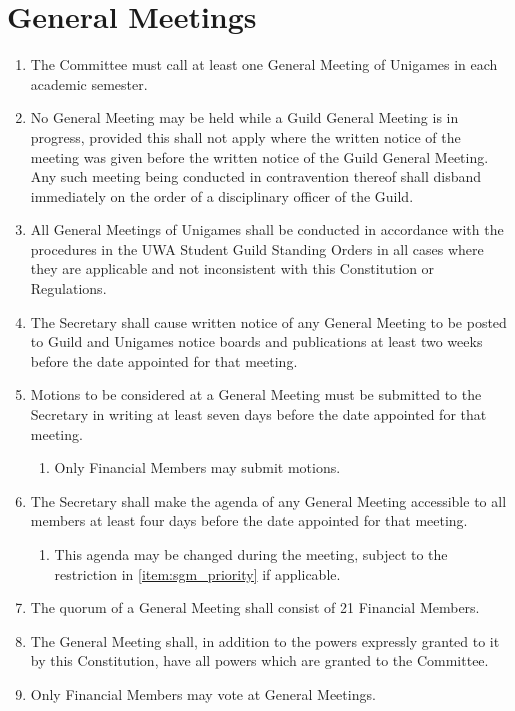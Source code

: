 \documentclass[a4paper]{article}
\begin{document}
\section{General Meetings} \label{sec:general_meetings}
\begin{enumerate}
    \item The Committee must call at least one General Meeting of Unigames in each academic semester.
    \item No General Meeting may be held while a Guild General Meeting is in progress, provided this shall not apply where the written notice of the meeting was given before the written notice of the Guild General Meeting. Any such meeting being conducted in contravention thereof shall disband immediately on the order of a disciplinary officer of the Guild.
    \item All General Meetings of Unigames shall be conducted in accordance with the procedures in the UWA Student Guild Standing Orders in all cases where they are applicable and not inconsistent with this Constitution or Regulations.
    \item The Secretary shall cause written notice of any General Meeting to be posted to Guild and Unigames notice boards and publications at least two weeks before the date appointed for that meeting.
    \item Motions to be considered at a General Meeting must be submitted to the Secretary in writing at least seven days before the date appointed for that meeting.
        \begin{enumerate}
            \item Only Financial Members may submit motions.
        \end{enumerate}
    \item The Secretary shall make the agenda of any General Meeting accessible to all members at least four days before the date appointed for that meeting.
        \begin{enumerate}
            \item This agenda may be changed during the meeting, subject to the restriction in \cref{item:sgm_priority} if applicable.
        \end{enumerate}
    \item The quorum of a General Meeting shall consist of 21 Financial Members.
    \item The General Meeting shall, in addition to the powers expressly granted to it by this Constitution, have all powers which are granted to the Committee.
    \item Only Financial Members may vote at General Meetings.

\end{enumerate}
\end{document}
